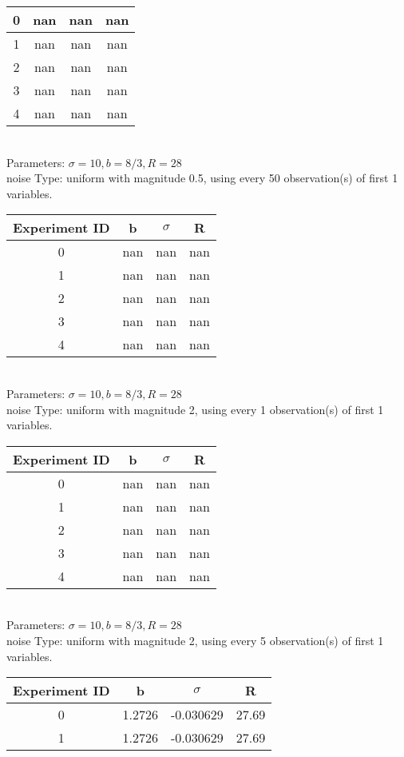 \begin{multicols}{3}
\begin{tabular}{cccc}
0 & nan & nan & nan\\ \hline 
 1 & nan & nan & nan\\ \hline 
 2 & nan & nan & nan\\ \hline 
 3 & nan & nan & nan\\ \hline 
 4 & nan & nan & nan\\ \hline 
 \end{tabular}\\
Parameters: $\sigma=10, b=8/3, R=28$\\
noise Type: uniform with magnitude 0.5, using every 50 observation(s) of first 1 variables.\\
\begin{tabular}{cccc}
\hline Experiment ID & b & $\sigma$ & R \\ \hline 
0 & nan & nan & nan\\ \hline 
 1 & nan & nan & nan\\ \hline 
 2 & nan & nan & nan\\ \hline 
 3 & nan & nan & nan\\ \hline 
 4 & nan & nan & nan\\ \hline 
 \end{tabular}\\
Parameters: $\sigma=10, b=8/3, R=28$\\
noise Type: uniform with magnitude 2, using every 1 observation(s) of first 1 variables.\\
\begin{tabular}{cccc}
\hline Experiment ID & b & $\sigma$ & R \\ \hline 
0 & nan & nan & nan\\ \hline 
 1 & nan & nan & nan\\ \hline 
 2 & nan & nan & nan\\ \hline 
 3 & nan & nan & nan\\ \hline 
 4 & nan & nan & nan\\ \hline 
 \end{tabular}\\
Parameters: $\sigma=10, b=8/3, R=28$\\
noise Type: uniform with magnitude 2, using every 5 observation(s) of first 1 variables.\\
\begin{tabular}{cccc}
\hline Experiment ID & b & $\sigma$ & R \\ \hline 
0 & 1.2726 & -0.030629 & 27.69\\ \hline 
 1 & 1.2726 & -0.030629 & 27.69\\ \hline 

\end{tabular}
\end{multicols}
